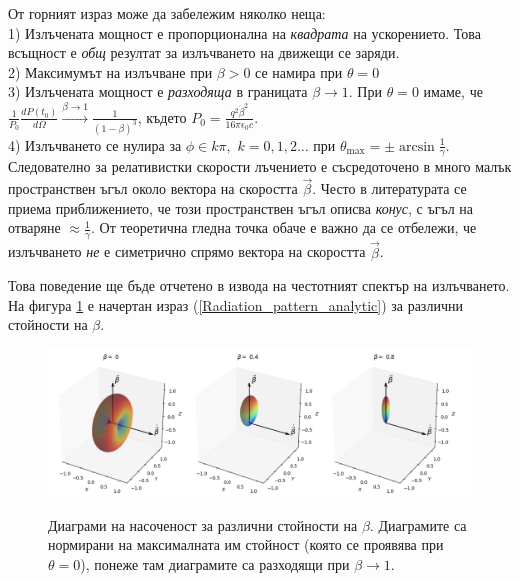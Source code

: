 \begin{appendices}
От горният израз може да забележим няколко неща:\\

1) Излъчената мощност е пропорционална на \emph{квадрата} на ускорението. Това всъщност е \emph{общ} резултат за излъчването на движещи се заряди.\\

2) Максимумът на излъчване при $\beta > 0$ се намира при $\theta = 0$\\

3) Излъчената мощност е \emph{разходяща} в границата $\beta\rightarrow 1$. При $\theta = 0$ имаме, че $\frac{1}{P_0}\frac{dP(t_0)}{d\Omega}\xrightarrow{\beta\rightarrow 1} \frac{1}{(1-\beta)^3}$, където $P_0 = \frac{q^2\dot{\beta}^2}{16\pi\epsilon_0 c}$.\\

4) Излъчването се нулира за $\phi \in k\pi,\,\, k = 0,1,2\dots$ при $\theta_{\max} = \pm \arcsin\frac{1}{\gamma}$. Следователно за релативистки скорости лъчението е съсредоточено в много малък пространствен ъгъл около вектора на скоростта $\vec{\beta}$. Често в литературата се приема приближението, че този пространствен ъгъл описва \emph{конус}, с ъгъл на отваряне $\approx \frac{1}{\gamma}$. От теоретична гледна точка обаче е важно да се отбележи, че излъчването \emph{не} е симетрично спрямо вектора на скоростта $\vec{\beta}$.

\newpage
Това поведение ще бъде отчетено в извода на честотният спектър на излъчването. На фигура \ref{Radiation_patterns_3D} е начертан израз (\ref{Radiation_pattern_analytic}) за различни стойности на $\beta$.

\begin{figure}[h!]
	\hspace{0.2cm}
	\includegraphics[scale = 0.4]{Radiation_Patterns_crop.png}\\
	\caption[Диаграми на насоченост]{Диаграми на насоченост за различни стойности на $\beta$. Диаграмите са нормирани на максималната им стойност (която се проявява при $\theta = 0$), понеже там диаграмите са разходящи при $\beta\rightarrow 1$.}
	\label{Radiation_patterns_3D}
\end{figure}


\end{appendices}
